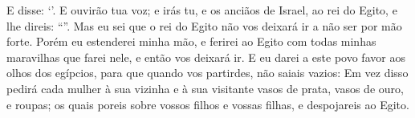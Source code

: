 {{{{  E disse: \enquote*{}}}.
  E ouvirão tua voz; e irás tu, e os anciãos de Israel, ao rei do Egito, e lhe direis: \enquote{}.
  Mas eu sei que o rei do Egito não vos deixará ir a não ser por mão forte.
  Porém eu estenderei minha mão, e ferirei ao Egito com todas minhas maravilhas que farei nele, e então vos deixará ir.
  E eu darei a este povo favor aos olhos dos egípcios, para que quando vos partirdes, não saiais vazios:
  Em vez disso pedirá cada mulher à sua vizinha e à sua visitante vasos de prata, vasos de ouro, e roupas; os quais poreis sobre vossos filhos e vossas filhas, e despojareis ao Egito}.
\par }

